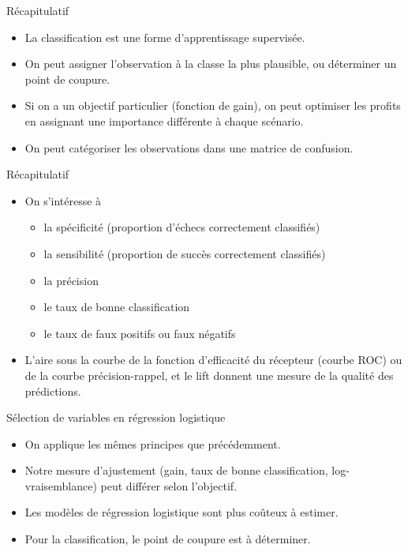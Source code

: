 \documentclass[
  ignorenonframetext,
]{beamer}
\providecommand{\tightlist}{%
  \setlength{\itemsep}{0pt}\setlength{\parskip}{0pt}}\usepackage{longtable,booktabs,array}
\begin{document}
\begin{frame}{Récapitulatif}
\label{ruxe9capitulatif}
\begin{itemize}
\tightlist
\item
  La classification est une forme d'apprentissage supervisée.
\item
  On peut assigner l'observation à la classe la plus plausible, ou
  déterminer un point de coupure.
\item
  Si on a un objectif particulier (fonction de gain), on peut optimiser
  les profits en assignant une importance différente à chaque scénario.
\item
  On peut catégoriser les observations dans une matrice de confusion.
\end{itemize}
\end{frame}

\begin{frame}{Récapitulatif}
\label{ruxe9capitulatif-1}
\begin{itemize}
\tightlist
\item
  On s'intéresse à

  \begin{itemize}
  \tightlist
  \item
    la spécificité (proportion d'échecs correctement classifiés)
  \item
    la sensibilité (proportion de succès correctement classifiés)
  \item
    la précision
  \item
    le taux de bonne classification
  \item
    le taux de faux positifs ou faux négatifs
  \end{itemize}
\item
  L'aire sous la courbe de la fonction d'efficacité du récepteur (courbe
  ROC) ou de la courbe précision-rappel, et le lift donnent une mesure
  de la qualité des prédictions.
\end{itemize}
\end{frame}

\begin{frame}{Sélection de variables en régression logistique}
\label{suxe9lection-de-variables-en-ruxe9gression-logistique}
\begin{itemize}
\tightlist
\item
  On applique les mêmes principes que précédemment.
\item
  Notre mesure d'ajustement (gain, taux de bonne classification,
  log-vraisemblance) peut différer selon l'objectif.
\item
  Les modèles de régression logistique sont plus coûteux à estimer.
\item
  Pour la classification, le point de coupure est à déterminer.
\end{itemize}
\end{frame}
\end{document}
